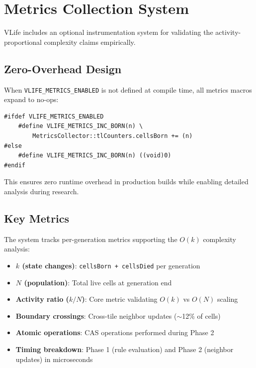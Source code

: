 \documentclass[11pt]{article}
\theoremstyle{definition}
\begin{document}
    \section{Metrics Collection System}

    VLife includes an optional instrumentation system for validating the activity-proportional complexity claims empirically.

    \subsection{Zero-Overhead Design}

    When \texttt{VLIFE\_METRICS\_ENABLED} is not defined at compile time, all metrics macros expand to no-ops:

    \begin{lstlisting}
#ifdef VLIFE_METRICS_ENABLED
    #define VLIFE_METRICS_INC_BORN(n) \
        MetricsCollector::tlCounters.cellsBorn += (n)
#else
    #define VLIFE_METRICS_INC_BORN(n) ((void)0)
#endif
    \end{lstlisting}

    This ensures zero runtime overhead in production builds while enabling detailed analysis during research.

    \subsection{Key Metrics}

    The system tracks per-generation metrics supporting the $O(k)$ complexity analysis:

    \begin{itemize}
        \item \textbf{$k$ (state changes)}: \texttt{cellsBorn + cellsDied} per generation
        \item \textbf{$N$ (population)}: Total live cells at generation end
        \item \textbf{Activity ratio ($k/N$)}: Core metric validating $O(k)$ vs $O(N)$ scaling
        \item \textbf{Boundary crossings}: Cross-tile neighbor updates ($\sim$12\% of cells)
        \item \textbf{Atomic operations}: CAS operations performed during Phase 2
        \item \textbf{Timing breakdown}: Phase 1 (rule evaluation) and Phase 2 (neighbor updates) in microseconds
    \end{itemize}
\end{document}
